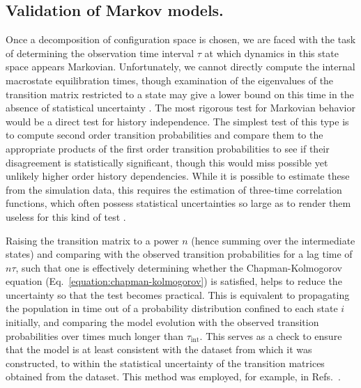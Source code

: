 \subsection{Validation of Markov models.}
\label{section:theory:validation}

Once a decomposition of configuration space is chosen, we are faced with the task of determining the observation time interval $\tau$ at which dynamics in this state space appears Markovian.
Unfortunately, we cannot directly compute the internal macrostate equilibration times, though examination of the eigenvalues of the transition matrix restricted to a state may give a lower bound on this time in the absence of statistical uncertainty \cite{meerbach:2004a}.
The most rigorous test for Markovian behavior would be a direct test for history independence.
The simplest test of this type is to compute second order transition probabilities and compare them to the appropriate products of the first order transition probabilities to see if their disagreement is statistically significant, though this would miss possible yet unlikely higher order history dependencies.
While it is possible to estimate these from the simulation data, this requires the estimation of three-time correlation functions, which often possess statistical uncertainties so large as to render them useless for this kind of test \cite{chodera:jpcb:2006}.

Raising the transition matrix to a power $n$ (hence summing over the intermediate states) and comparing with the observed transition probabilities for a lag time of $n\tau$, such that one is effectively determining whether the Chapman-Kolmogorov equation (Eq.\ \ref{equation:chapman-kolmogorov}) is satisfied, helps to reduce the uncertainty so that the test becomes practical.
This is equivalent to propagating the population in time out of a probability distribution confined to each state $i$ initially, and comparing the model evolution with the observed transition probabilities over times much longer than $\tau_{\mathrm{int}}$.
This serves as a check to ensure that the model is at least consistent with the dataset from which it was constructed, to within the statistical uncertainty of the transition matrices obtained from the dataset.
This method was employed, for example, in Refs.\ \cite{swope:2004a,chodera:mms:2006}.

